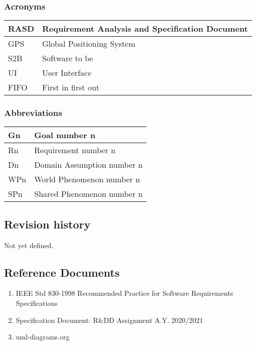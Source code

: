 \subsubsection{Acronyms}
\begin{tabular}{ | m{5cm} | m{10cm} | }
	\hline
	RASD & Requirement Analysis and Specification Document \\
	\hline
	GPS & Global Positioning System \\
	\hline
	S2B & Software to be \\
	\hline
	UI & User Interface\\
	\hline
	FIFO & First in first out\\
	\hline
\end{tabular}
\subsubsection{Abbreviations}
\begin{tabular}{ | m{5cm} | m{10cm} | }
	\hline
	Gn & Goal number n \\
	\hline
	Rn & Requirement number n \\
	\hline
	Dn & Domain Assumption number n \\
	\hline
	WPn & World Phenomenon number n \\
	\hline
	SPn & Shared Phenomenon number n \\
	\hline
\end{tabular}
\subsection{Revision history}
Not yet defined.
\subsection{Reference Documents}
\begin{enumerate}
	\item IEEE Std 830-1998 Recommended Practice for Software Requirements Specifications
	\item Specification Document: R\&DD Assignment A.Y. 2020/2021
	\item uml-diagrams.org
\end{enumerate}

